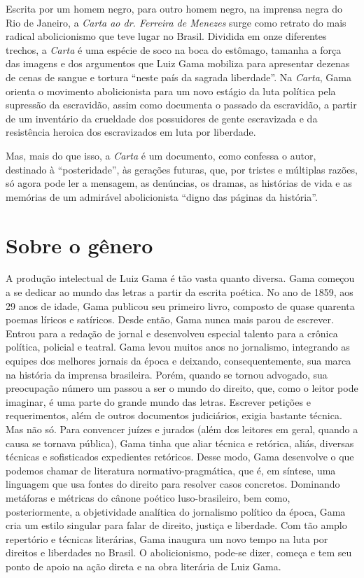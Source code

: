 Escrita por um homem negro, para outro homem negro, na imprensa negra do
Rio de Janeiro, a \emph{Carta ao dr. Ferreira de Menezes} surge como retrato do mais radical
abolicionismo que teve lugar no Brasil. Dividida em onze diferentes
trechos, a \emph{Carta} é uma espécie de soco na boca do estômago,
tamanha a força das imagens e dos argumentos que Luiz Gama mobiliza para
apresentar dezenas de cenas de sangue e tortura ``neste país da sagrada
liberdade''. Na \emph{Carta}, Gama orienta o movimento abolicionista
para um novo estágio da luta política pela supressão da escravidão,
assim como documenta o passado da escravidão, a partir de um inventário
da crueldade dos possuidores de gente escravizada e da resistência
heroica dos escravizados em luta por liberdade.

Mas, mais do que isso, a \emph{Carta} é um documento, como confessa o
autor, destinado à ``posteridade'', às gerações futuras, que, por
tristes e múltiplas razões, só agora pode ler a mensagem, as denúncias,
os dramas, as histórias de vida e as memórias de um admirável
abolicionista ``digno das páginas da história''.

\section{Sobre o gênero}

A produção intelectual de Luiz Gama é tão vasta quanto diversa. Gama
começou a se dedicar ao mundo das letras a partir da escrita poética. No
ano de 1859, aos 29 anos de idade, Gama publicou seu primeiro livro,
composto de quase quarenta poemas líricos e satíricos. Desde então, Gama
nunca mais parou de escrever. Entrou para a redação de jornal e
desenvolveu especial talento para a crônica política, policial e
teatral. Gama levou muitos anos no jornalismo, integrando as equipes dos
melhores jornais da época e deixando, consequentemente, sua marca na
história da imprensa brasileira. Porém, quando se tornou advogado, sua
preocupação número um passou a ser o mundo do direito, que, como o leitor
pode imaginar, é uma parte do grande mundo das letras. Escrever petições
e requerimentos, além de outros documentos judiciários, exigia bastante
técnica. Mas não só. Para convencer juízes e jurados (além dos leitores
em geral, quando a causa se tornava pública), Gama tinha que aliar
técnica e retórica, aliás, diversas técnicas e sofisticados expedientes
retóricos. Desse modo, Gama desenvolve o que podemos chamar de
literatura normativo-pragmática, que é, em síntese, uma linguagem que
usa fontes do direito para resolver casos concretos. Dominando metáforas
e métricas do cânone poético luso-brasileiro, bem como, posteriormente,
a objetividade analítica do jornalismo político da época, Gama cria um
estilo singular para falar de direito, justiça e liberdade. Com tão
amplo repertório e técnicas literárias, Gama inaugura um novo tempo na
luta por direitos e liberdades no Brasil. O abolicionismo, pode-se
dizer, começa e tem seu ponto de apoio na ação direta e na obra
literária de Luiz Gama.

